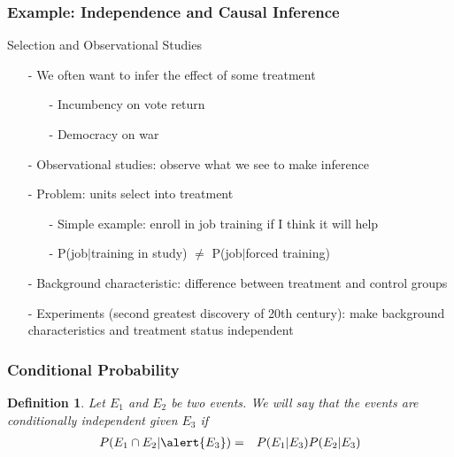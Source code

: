 \documentclass{beamer}
\newtheorem{defn}{Definition}
\numberwithin{equation}{section}
\begin{document}
\begin{frame}
\frametitle{Example: Independence and Causal Inference} 

Selection and Observational Studies
\begin{itemize}
\item[-] We often want to infer the effect of some treatment 
\begin{itemize}
\item[-] Incumbency on vote return 
\item[-] Democracy on war
\end{itemize}
\item[-] Observational studies: observe what we see to make inference 
\item[-] Problem: units select into treatment 
\begin{itemize}
\item[-] Simple example: enroll in job training if I think it will help 
\item[-] P(job$|$training in study) $\neq$ P(job$|$forced training) 
\end{itemize}
\item[-] \alert{Background characteristic}: difference between
  treatment and control groups
\item[-] \alert{Experiments} (second greatest discovery of 20th
  century): make background characteristics and treatment status
  independent 
\end{itemize}


\end{frame}


\begin{frame}
\frametitle{Conditional Probability}

\begin{defn}
Let $E_{1}$ and $E_{2}$ be two events.  We will say that the events are conditionally independent given $E_{3}$ if 
\begin{eqnarray}
P(E_{1} \cap E_{2} | \alert{E_{3}}) & = & P(E_{1} | E_{3} ) P(E_{2} | E_{3} ) \nonumber 
\end{eqnarray}


\end{defn}



\end{frame}
\end{document}

